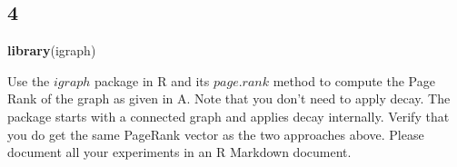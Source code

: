 \documentclass[]{article}
\newenvironment{Shaded}{\begin{snugshade}}{\end{snugshade}}
\newcommand{\KeywordTok}[1]{\textcolor[rgb]{0.13,0.29,0.53}{\textbf{{#1}}}}
\newcommand{\DataTypeTok}[1]{\textcolor[rgb]{0.13,0.29,0.53}{{#1}}}
\newcommand{\DecValTok}[1]{\textcolor[rgb]{0.00,0.00,0.81}{{#1}}}
\newcommand{\StringTok}[1]{\textcolor[rgb]{0.31,0.60,0.02}{{#1}}}
\newcommand{\OtherTok}[1]{\textcolor[rgb]{0.56,0.35,0.01}{{#1}}}
\newcommand{\NormalTok}[1]{{#1}}
\begin{document}
\newpage

\subsection{4}\label{section-3}

\begin{Shaded}
\begin{Highlighting}[]
\KeywordTok{library}\NormalTok{(igraph)}
\end{Highlighting}
\end{Shaded}

Use the \(igraph\) package in R and its \(page.rank\) method to compute
the Page Rank of the graph as given in A. Note that you don't need to
apply decay. The package starts with a connected graph and applies decay
internally. Verify that you do get the same PageRank vector as the two
approaches above. Please document all your experiments in an R Markdown
document.

\begin{Shaded}
\end{Shaded}
\end{document}

